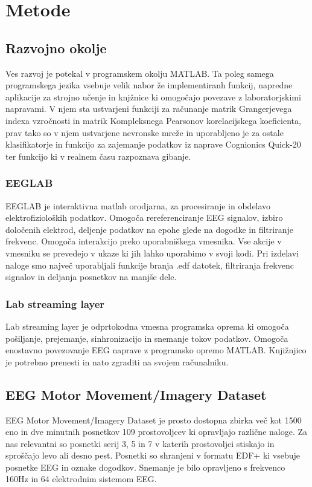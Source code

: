 \chapter{Metode}

\section{Razvojno okolje}
Ves razvoj je potekal v programskem okolju MATLAB. Ta poleg samega programskega jezika vsebuje velik nabor že implementiranh funkcij, napredne aplikacije za strojno učenje in knjžnice ki omogočajo povezave z laboratorjskimi napravami. V njem sta ustvarjeni funkciji za računanje matrik Grangerjevega indexa vzročnosti
in matrik Kompleksnega Pearsonov korelacijskega koeficienta, prav tako so v njem ustvarjene nevronske mreže in uporabljeno je za ostale klasifikatorje in funkcijo za zajemanje podatkov iz naprave Cognionics Quick-20 ter funkcijo ki v realnem času razpoznava gibanje.
    
\subsection{EEGLAB}
EEGLAB je interaktivna matlab orodjarna, za procesiranje in obdelavo elektrofizioloških podatkov. Omogoča rereferenciranje EEG signalov, izbiro določenih elektrod, deljenje podatkov na epohe glede na dogodke in filtriranje frekvenc. Omogoča interakcijo preko uporabniškega vmesnika. Vse akcije v vmesniku se prevedejo v ukaze ki jih lahko uporabimo v svoji kodi. Pri izdelavi naloge smo največ uporabljali funkcije branja .edf datotek, filtriranja frekvenc signalov in deljanja posnetkov na manjše dele.\cite{noauthor_eeglab_nodate}

\subsection{Lab streaming layer}
Lab streaming layer je odprtokodna vmesna programska oprema ki omogoča pošiljanje, prejemanje, sinhronizacijo in snemanje tokov podatkov. Omogoča enostavno povezovanje EEG naprave z programsko opremo MATLAB. Knjižnjico je potrebno prenesti in nato zgraditi na svojem računalniku.  \cite{noauthor_lsl-website_nodate}

\section{EEG Motor Movement/Imagery Dataset}
EEG Motor Movement/Imagery Dataset je prosto dostopna zbirka več kot 1500 eno in dve minutnih posnetkov 109 prostovoljcev ki opravljajo različne naloge. Za nas relevantni so posnetki serij 3, 5 in 7 v katerih prostovoljci stiskajo in sproščajo levo ali desno pest. Posnetki so shranjeni v formatu EDF+ ki vsebuje posnetke EEG in oznake dogodkov. Snemanje je bilo opravljeno s frekvenco 160Hz in 64 elektrodnim sistemom EEG.\cite{schalk_eeg_2009,schalk_bci2000_2004}

